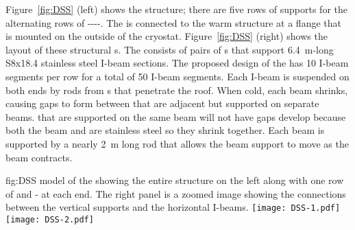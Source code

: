 Figure~\ref{fig:DSS} (left) shows the  structure; there are
five rows of supports for the alternating rows of
----.  The
 is connected to the warm structure at a flange that is
mounted on the outside of the cryostat.  Figure~\ref{fig:DSS} (right)
shows the layout of these structural \fdth{}s.  The 
consists of pairs of \fdth{}s that support \SI{6.4}{m}-long
S8x18.4 stainless steel I-beam sections. The proposed design of the
 has \num{10} I-beam segments per row for a total of
\num{50} I-beam segments. Each I-beam is suspended on both ends by
rods from \fdth{}s that penetrate the roof.  %
When cold, each beam shrinks, causing gaps to form between
 that are adjacent but supported on separate beams.
 that are supported on the same beam will not have gaps
develop because both the beam and  are stainless steel so
they shrink together.  Each beam is supported by a nearly
\SI{2}{m} long rod that allows the beam support to move as the beam
contracts.

\begin{dunefigure}{fig:DSS}
  {\threed model of the  showing the entire
  structure on the left along with one row of  and
  - at each end. The right panel is a zoomed image
  showing the connections between the vertical supports and the
  horizontal I-beams.}
\texttt{[image: DSS-1.pdf]}
 \texttt{[image: DSS-2.pdf]}
\end{dunefigure}



